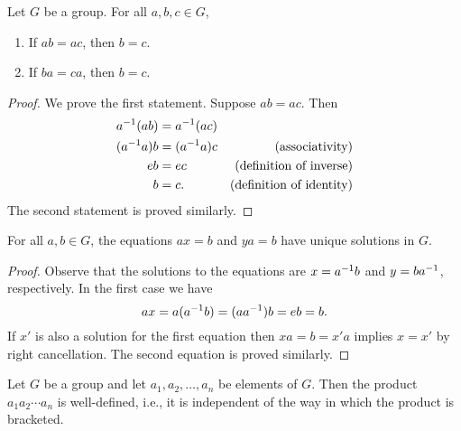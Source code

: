 \begin{theorem}
    Let \(G\) be a group. For all \(a, b, c \in G\),
    \begin{enumerate}
        \item If \(ab = ac\), then \(b = c\).
        \item If \(ba = ca\), then \(b = c\).
    \end{enumerate}
\end{theorem}

\begin{proof}
    We prove the first statement. Suppose \(ab = ac\). Then
    \begin{align*}
        a^{-1}(ab) &= a^{-1}(ac) &\\
        (a^{-1} a)b &= (a^{-1} a)c &\text{(associativity)}\\
        eb &= ec &\text{(definition of inverse)}\\
        b &= c. &\text{(definition of identity)}
    \end{align*}
    The second statement is proved similarly.
\end{proof}

\begin{corollary}
    For all \(a, b \in G\), the equations \(ax = b\) and \(ya = b\) have unique
    solutions in \(G\).
\end{corollary}

\begin{proof}
    Observe that the solutions to the equations are \(x = a^{-1} b\) and \(y =
    ba^{-1}\), respectively. In the first case we have
    \[
        ax = a(a^{-1} b) = (aa^{-1})b = eb = b.
    \]
    If \(x'\) is also a solution for the first equation then \(xa = b = x'a\)
    implies \(x = x'\) by right cancellation. The second equation is proved
    similarly.
\end{proof}

\begin{theorem}
    \label{thm:generalized-associative-law}
    Let \(G\) be a group and let \(a_1, a_2, \ldots, a_n\) be elements of \(G\).
    Then the product \(a_1 a_2 \cdots a_n\) is well-defined, i.e., it is
    independent of the way in which the product is bracketed.
\end{theorem}

